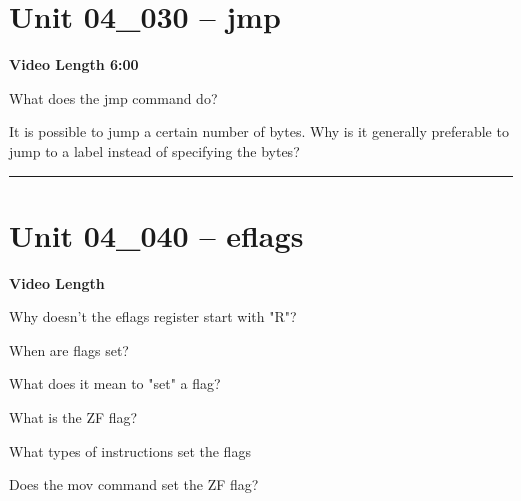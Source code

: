 \documentclass[letterpaper,12pt]{exam}
\newcommand{\unit}{Unit 04}
\begin{document}
\begin{questions}
 \section*{\unit\_030 -- jmp}
 \par{\selectfont\textbf{Video Length 6:00}}
 \begin{samepage}
     \question What does the jmp command do?
     \vspace{5mm}
 \end{samepage}
 \par
    \begin{samepage}
        \question It is possible to jump a certain number of bytes.  Why is it generally preferable to jump to a label instead of specifying the bytes?    
        \vspace{25mm}
    \end{samepage}
    \begin{center}
 \rule{0.5\textwidth}{.4pt} %
    \end{center}

\section*{\unit\_040 -- eflags}
\par{\selectfont\textbf{Video Length }}
\begin{samepage}
    \question Why doesn't the eflags register start with "R"?
    \vspace{5mm}
\end{samepage}
\par
\begin{samepage}
    \question When are flags set?
    \vspace{5mm}
\end{samepage}
\par
\begin{samepage}
    \question What does it mean to "set" a flag?
    \vspace{5mm}
\end{samepage}
\par
  
\begin{samepage}
    \question What is the ZF flag?
    \vspace{5mm}

\end{samepage}
\begin{samepage}
    \question What types of instructions set the flags
    \vspace{5mm}
\end{samepage}
\par
 \begin{samepage}
     \question Does the mov command set the ZF flag?
     \vspace{5mm}
 \end{samepage}
 \par
  

\end{questions}
\end{document}
